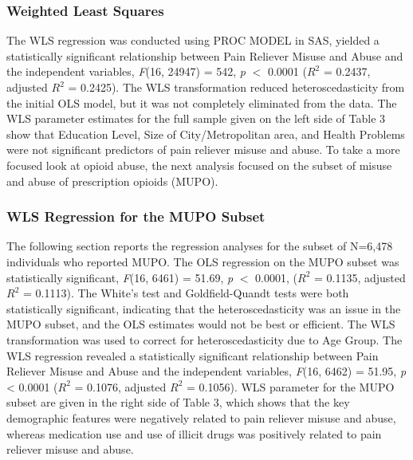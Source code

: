 \documentclass[sigconf]{acmart}
\begin{document}
\subsubsection{Weighted Least Squares} 

The WLS regression was conducted using PROC MODEL in SAS, yielded a 
statistically significant relationship between Pain Reliever Misuse and Abuse 
and the independent variables, \textit{F}(16, 24947) = 542, \textit{p} $<$ 
0.0001 ($R^2$ = 0.2437, adjusted $R^2$ = 0.2425). The WLS transformation 
reduced heteroscedasticity from the initial OLS model, but it was not 
completely eliminated from the data. The WLS parameter estimates for the full 
sample given on the left side of Table 3 show that Education Level, Size of 
City/Metropolitan area, and Health Problems  were not significant predictors of
pain reliever misuse and abuse. To take a more focused look at opioid abuse,
the next analysis focused on the subset of misuse and abuse of 
prescription opioids (MUPO). 


\subsubsection{WLS Regression for the MUPO Subset} 

The following section reports the regression analyses for the subset of 
N=6,478 individuals who reported MUPO. The OLS regression on the MUPO subset 
was statistically significant, \textit{F}(16, 6461) = 51.69, \textit{p} 
$<$ 0.0001, ($R^2$ = 0.1135, adjusted $R^2$ = 0.1113). The White’s test and 
Goldfield-Quandt tests were both statistically significant, indicating that
the heteroscedasticity was an issue in the MUPO subset, and the OLS estimates 
would not be best or efficient. The WLS transformation was used to correct 
for heteroscedasticity due to Age Group. The WLS regression revealed a 
statistically significant relationship between Pain Reliever Misuse and 
Abuse and the independent variables, \textit{F}(16, 6462) = 51.95, 
\textit{p} < 0.0001 ($R^2$ = 0.1076, adjusted $R^2$ = 0.1056). WLS parameter 
for the MUPO subset are given in the right side of Table 3, which shows that
the key demographic features were negatively related to pain reliever misuse 
and abuse, whereas medication use and use of illicit drugs was positively 
related to pain reliever misuse and abuse. 
\end{document}
